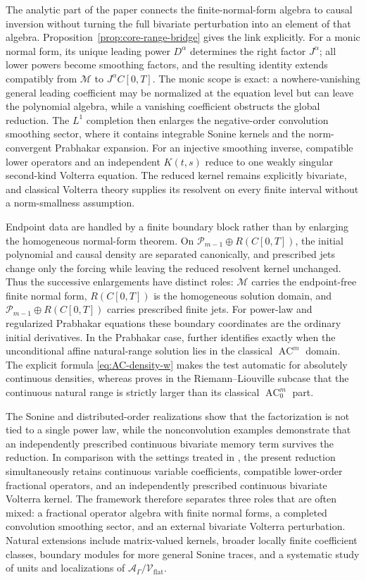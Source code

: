 \documentclass[11pt]{article}
\numberwithin{equation}{section}
\theoremstyle{definition}
\theoremstyle{remark}
\newcommand{\M}{\mathcal M}
\newcommand{\A}{\mathcal A}
\newcommand{\Vflat}{\mathcal V_{\mathrm{flat}}}
\newcommand{\AC}{\operatorname{AC}}
\begin{document}
The analytic part of the paper connects the finite-normal-form algebra to causal inversion without turning the full bivariate perturbation into an element of that algebra.  Proposition~\ref{prop:core-range-bridge} gives the link explicitly.  For a monic normal form, its unique leading power $D^\alpha$ determines the right factor $J^\alpha$; all lower powers become smoothing factors, and the resulting identity extends compatibly from $\M$ to $J^\alpha C[0,T]$. The monic scope is exact: a nowhere-vanishing general leading coefficient may be normalized at the equation level but can leave the polynomial algebra, while a vanishing coefficient obstructs the global reduction. The $L^1$ completion then enlarges the negative-order convolution smoothing sector, where it contains integrable Sonine kernels and the norm-convergent Prabhakar expansion. For an injective smoothing inverse, compatible lower operators and an independent $K(t,s)$ reduce to one weakly singular second-kind Volterra equation. The reduced kernel remains explicitly bivariate, and classical Volterra theory supplies its resolvent on every finite interval without a norm-smallness assumption.

Endpoint data are handled by a finite boundary block rather than by enlarging the homogeneous normal-form theorem. On $\mathcal P_{m-1}\oplus R(C[0,T])$, the initial polynomial and causal density are separated canonically, and prescribed jets change only the forcing while leaving the reduced resolvent kernel unchanged. Thus the successive enlargements have distinct roles: $\M$ carries the endpoint-free finite normal form, $R(C[0,T])$ is the homogeneous solution domain, and $\mathcal P_{m-1}\oplus R(C[0,T])$ carries prescribed finite jets. For power-law and regularized Prabhakar equations these boundary coordinates are the ordinary initial derivatives. In the Prabhakar case,  further identifies exactly when the unconditional affine natural-range solution lies in the classical $\AC^m$ domain. The explicit formula \eqref{eq:AC-density-w} makes the test automatic for absolutely continuous densities, whereas  proves in the Riemann--Liouville subcase that the continuous natural range is strictly larger than its classical $\AC_0^m$ part.

The Sonine and distributed-order realizations show that the factorization is not tied to a single power law, while the nonconvolution examples demonstrate that an independently prescribed continuous bivariate memory term survives the reduction. In comparison with the settings treated in \cite{Eshaghi2021,FernandezRestrepo2022,Guzoglu2026}, the present reduction simultaneously retains continuous variable coefficients, compatible lower-order fractional operators, and an independently prescribed continuous bivariate Volterra kernel. The framework therefore separates three roles that are often mixed: a fractional operator algebra with finite normal forms, a completed convolution smoothing sector, and an external bivariate Volterra perturbation. Natural extensions include matrix-valued kernels, broader locally finite coefficient classes, boundary modules for more general Sonine traces, and a systematic study of units and localizations of $\A_\Gamma/\Vflat$.
\end{document}
